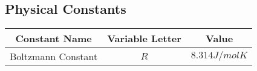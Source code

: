 \subsection{Physical Constants} \label{app:Physical Constants}
	\begin{table}[h!]
		\centering
		\begin{tabular}{|c|c|c|}
			\hline
			Constant Name & Variable Letter & Value \\ \hline
			Boltzmann Constant & $R$ & $8.314 J/mol K$ \\ \hline
		\end{tabular}
	\end{table}